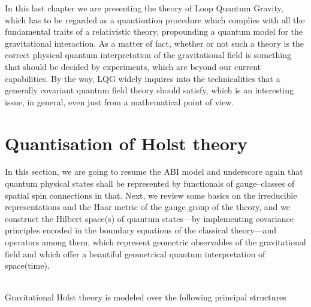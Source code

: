 {In this last chapter we are presenting the theory of Loop Quantum Gravity, which has to be regarded as a quantisation procedure which complies with all the fundamental traits of a relativistic theory, propounding a quantum model for the gravitational interaction. As a matter of fact, whether or not such a theory is the correct physical quantum interpretation of the gravitational field is something that should be decided by experiments, which are beyond our current capabilities. By the way, LQG widely inquires into the technicalities that a generally covariant quantum field theory should satisfy, which is an interesting issue, in general, even just from a mathematical point of view.}\, %



{\section{Quantisation of Holst theory}
  In this section, we are going to resume the ABI model and underscore again that quantum physical states shall be represented by functionals of gauge--classes of spatial spin connections in that. Next, we review some basics on the irreducible representations and the Haar metric  of the gauge group of the theory, and we construct the Hilbert space(s) of quantum states---by implementing covariance principles encoded in the boundary equations of the classical theory---and operators among them, which represent geometric observables of the gravitational field and which offer a beautiful geometrical quantum interpretation of space(time).}\\

Gravitational Holst theory is modeled over the following principal structures %

